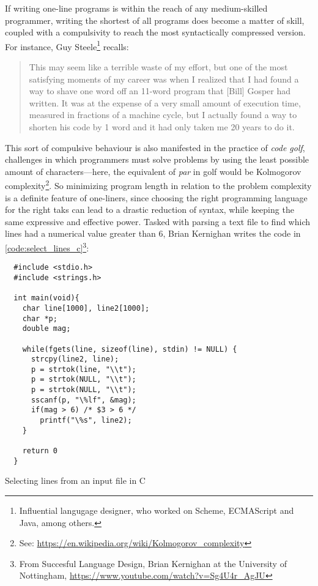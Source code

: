 If writing one-line programs is within the reach of any medium-skilled programmer, writing the shortest of all programs does become a matter of skill, coupled with a compulsivity to reach the most syntactically compressed version. For instance, Guy Steele\footnote{Influential langugage designer, who worked on Scheme, ECMAScript and Java, among others.} recalls:

\begin{quote}
  This may seem like a terrible waste of my effort, but one of the most satisfying moments of my career was when I realized that I had found a way to shave one word off an 11-word program that [Bill] Gosper had written. It was at the expense of a very small amount of execution time, measured in fractions of a machine cycle, but I actually found a way to shorten his code by 1 word and it had only taken me 20 years to do it\cite{seibel_coders_2009}.
\end{quote}

This sort of compulsive behaviour is also manifested in the practice of \emph{code golf}, challenges in which programmers must solve problems by using the least possible amount of characters—here, the equivalent of \emph{par} in golf would be Kolmogorov complexity\footnote{See: \url{https://en.wikipedia.org/wiki/Kolmogorov_complexity}}. So minimizing program length in relation to the problem complexity is a definite feature of one-liners, since choosing the right programming language for the right taks can lead to a drastic reduction of syntax, while keeping the same expressive and effective power. Tasked with parsing a text file to find which lines had a numerical value greater than 6, Brian Kernighan writes the code in \ref{code:select_lines_c}\footnote{From Succesful Language Design, Brian Kernighan at the University of Nottingham, \url{https://www.youtube.com/watch?v=Sg4U4r_AgJU}}:

\pagebreak
\begin{listing}
  \begin{verbatim} 
  #include <stdio.h>
  #include <strings.h>

  int main(void){
    char line[1000], line2[1000];
    char *p;
    double mag;

    while(fgets(line, sizeof(line), stdin) != NULL) {
      strcpy(line2, line);
      p = strtok(line, "\\t");
      p = strtok(NULL, "\\t");
      p = strtok(NULL, "\\t");
      sscanf(p, "\%lf", &mag);
      if(mag > 6) /* $3 > 6 */
        printf("\%s", line2); 
    }

    return 0
  }
\end{verbatim}
  \caption{Selecting lines from an input file in C}
  \label{code:select_lines_c}
\end{listing}

